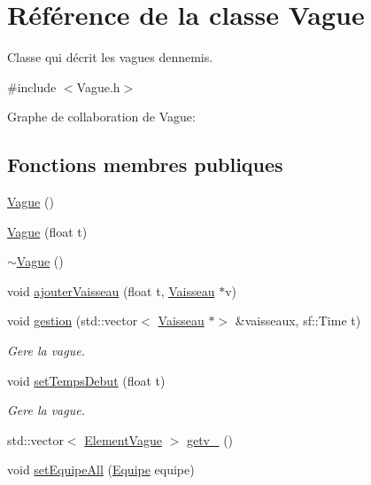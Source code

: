 \hypertarget{class_vague}{}\section{Référence de la classe Vague}
\label{class_vague}


Classe qui décrit les vagues d\textquotesingle{}ennemis.  




{\ttfamily \#include $<$Vague.\+h$>$}



Graphe de collaboration de Vague\+:
\subsection*{Fonctions membres publiques}
\begin{DoxyCompactItemize}
\item 
\hyperlink{class_vague_ab1e4786aa02ad641431b56658dbbaac3}{Vague} ()
\item 
\hyperlink{class_vague_a5a77009c7b36f68c5c5090c72294faa4}{Vague} (float t)
\item 
\hyperlink{class_vague_a72eb74bd6b6cc6de266fa4b8f77e56d4}{$\sim$\+Vague} ()
\item 
void \hyperlink{class_vague_a82124cdeb165825047f9dd8164e69a16}{ajouter\+Vaisseau} (float t, \hyperlink{class_vaisseau}{Vaisseau} $\ast$v)
\item 
void \hyperlink{class_vague_a37649d5f8063b1d516ce1f865a9d521d}{gestion} (std\+::vector$<$ \hyperlink{class_vaisseau}{Vaisseau} $\ast$$>$ \&vaisseaux, sf\+::\+Time t)
\begin{DoxyCompactList}\small\item\em Gere la vague. \end{DoxyCompactList}\item 
void \hyperlink{class_vague_a564d612f69751dd198ffa7ac61ea04dd}{set\+Temps\+Debut} (float t)
\begin{DoxyCompactList}\small\item\em Gere la vague. \end{DoxyCompactList}\item 
std\+::vector$<$ \hyperlink{struct_element_vague}{Element\+Vague} $>$ \hyperlink{class_vague_a1d927f38da46323e72208aaeb1b07d5b}{getv\+\_\+} ()
\item 
void \hyperlink{class_vague_aed7f0a70cc0d93ed686af4e100376974}{set\+Equipe\+All} (\hyperlink{constantes_8h_a08fa5554288d5031a8f3bb83cc04ee83}{Equipe} equipe)
\end{DoxyCompactItemize}


